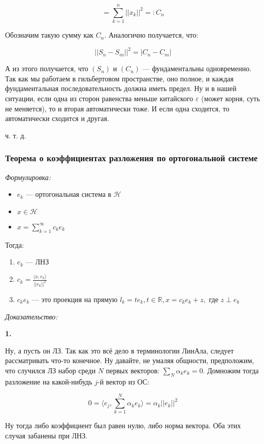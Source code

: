 \documentclass{article}
\def\sk#1#2{\langle #1, #2 \rangle}
\begin{document}
\[=\sum_{k = 1}^{n} ||x_k||^2 =: C_n\]

Обозначим такую сумму как $C_n$. Аналогично получается, что:

\[||S_n - S_m||^2 = |C_n - C_m|\]

А из этого получается, что $(S_n)$ и $(C_n)$ --- фундаментальны одновременно. Так как мы работаем в гильбертовом пространстве, оно полное, и каждая фундаментальная последовательность должна иметь предел. Ну и в нашей ситуации, если одна из сторон равенства меньше китайского $\varepsilon$ (может корня, суть не меняется), то и вторая автоматически тоже. И если одна сходится, то автоматически сходится и другая.

ч. т. д. 

\subsubsection{Теорема о коэффициентах разложения по ортогональной системе}
\textit{Формулировка:}

\begin{itemize}
    \item ${e_k}$ --- ортогональная система в $\mathcal{H}$
    \item $x \in \mathcal{H}$
    \item $x = \sum_{k = 1}^{\infty} c_k e_k$
\end{itemize}

Тогда:

\begin{enumerate}
    \item ${e_k}$ --- ЛНЗ
    \item $c_k = \frac{\langle x, e_k \rangle}{||e_k||^2}$
    \item $c_ke_k$ --- это проекция на прямую $l_k = {te_k, t \in \mathbb{R}}, x = c_ke_k + z, $ где $z \perp e_k$
\end{enumerate}

\textit{Доказательство:}

\textbf{1.}

Ну, а пусть он ЛЗ. Так как это всё дело в терминологии ЛинАла, следует рассматривать что-то конечное. Ну давайте, не умаляя общности, предположим, что случился ЛЗ набор среди $N$ первых векторов: $\sum_N \alpha_k e_k = 0$. Домножим тогда разложение на какой-нибудь $j$-й вектор из ОС:

\[0 = \sk{e_j}{\sum_{k = 1}^{N} \alpha_k e_k} = \alpha_k ||e_k||^2\]

Ну тогда либо коэффициент был равен нулю, либо норма вектора. Оба этих случая забанены при ЛНЗ.
\end{document}
